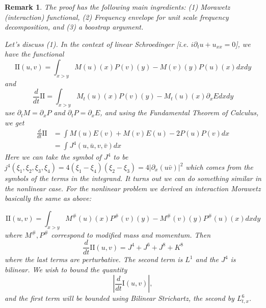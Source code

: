 \documentclass{article}
\newtheorem{remark}{Remark}
\begin{document}
\begin{remark}
  The proof has the following main ingredients: (1) Morawetz (interaction)
  functional, (2) Frequency envelope for unit scale frequency decomposition, and
  (3) a boostrap argument.

  Let's discuss (1). In the context of linear Schroedinger [i.e.
  $i\partial_{t}u+u_{xx}=0$], we have the functional
  \begin{equation*}
    \mathrm{II}(u,v) 
    = \int_{x>y}M(u)(x)P(v)(y)-M(v)(y)P(u)(x)dxdy
  \end{equation*}
  and
  \begin{equation*}
    \frac{d}{dt}\mathrm{II} 
    = \int_{x>y}M_{t}(u)(x)P(v)(y)-M_{t}(u)(x)\partial_{x}E dxdy
  \end{equation*}
  use $\partial_{t}M = \partial_{x}P$ and $\partial_{t}P = \partial_{x}E$, and
  using the Fundamental Theorem of Calculus, we get
  \begin{align*}
    \frac{d}{dt}\mathrm{II}
    &= \int M(u)E(v)+M(v)E(u)-2P(u)P(v)dx\\
    &= \int J^{4}(u,\bar{u},v,\bar{v})dx 
  \end{align*}
  Here we can take the symbol of $J^{4}$ to be
  $j^{4}(\xi_{1},\xi_{2},\xi_{3},\xi_{4})=4(\xi_{1}-\xi_{4})(\xi_{2}-\xi_{3}) =
  4 \left| \partial_{x}(u\bar{v}) \right|^{2}$ which comes from the symbols of
  the terms in the integrand. It turns out we can do something similar in the
  nonlinear case. For the nonlinear problem we derived an interaction Morawetz
  basically the same as above:

  \begin{equation*}
    \mathrm{II}(u,v) 
    = \int_{x>y}M^{\#}(u)(x)P^{\#}(v)(y)-M^{\#}(v)(y)P^{\#}(u)(x)dxdy 
  \end{equation*}
  where $M^{\#},P^{\#}$ correspond to modified mass and momentum. Then
  \begin{equation*}
    \frac{d}{dt}\mathrm{II}(u,v) 
    = J^{4}+J^{6}+J^{8}+K^{8}
  \end{equation*}
  where the last terms are perturbative. The second term is $L^{1}$ and the
  $J^{4}$ is bilinear. We wish to bound the quantity
  \begin{equation*}
    \left| \frac{d}{dt}\mathrm{I}(u,v) \right|,
  \end{equation*}
  and the first term will be bounded using Bilinear Strichartz, the second by
  $L^{6}_{t,x}$.
\end{remark}
\end{document}
